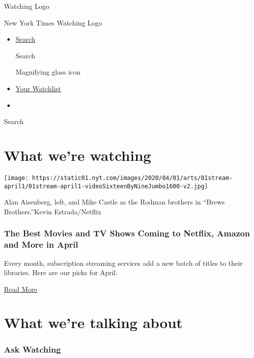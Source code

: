 \href{/watching}{}

Watching Logo

New York Times Watching Logo

\begin{itemize}
\item
  \href{/watching/search}{Search}

  Search

  Magnifying glass icon
\item
  \href{/watching/watchlist}{Your Watchlist}
\item
\end{itemize}

Search

\hypertarget{what-were-watching}{%
\section{What we're watching}\label{what-were-watching}}

\texttt{[image: https://static01.nyt.com/images/2020/04/01/arts/01stream-april1/01stream-april1-videoSixteenByNineJumbo1600-v2.jpg]}

Alan Aisenberg, left, and Mike Castle as the Rodman brothers in ``Brews
Brothers.''Kevin Estrada/Netflix

\hypertarget{the-best-movies-and-tv-shows-coming-to-netflix-amazon-and-more-in-april}{%
\subsubsection{The Best Movies and TV Shows Coming to Netflix, Amazon
and More in
April}\label{the-best-movies-and-tv-shows-coming-to-netflix-amazon-and-more-in-april}}

Every month, subscription streaming services add a new batch of titles
to their libraries. Here are our picks for April.

\href{https://www.nytimes.com/2020/04/01/arts/television/new-to-stream-netflix.html}{Read
More}

\hypertarget{what-were-talking-about}{%
\section{What we're talking about}\label{what-were-talking-about}}

\hypertarget{ask-watching}{%
\subsubsection{Ask Watching}\label{ask-watching}}


